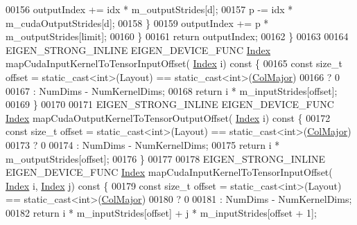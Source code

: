 \begin{DoxyCode}
00156         outputIndex += idx * m\_outputStrides[d];
00157         p -= idx * m\_cudaOutputStrides[d];
00158       \}
00159       outputIndex += p * m\_outputStrides[limit];
00160     \}
00161     \textcolor{keywordflow}{return} outputIndex;
00162   \}
00163 
00164   EIGEN\_STRONG\_INLINE EIGEN\_DEVICE\_FUNC \hyperlink{namespace_eigen_a62e77e0933482dafde8fe197d9a2cfde}{Index} mapCudaInputKernelToTensorInputOffset(
      \hyperlink{namespace_eigen_a62e77e0933482dafde8fe197d9a2cfde}{Index} i)\textcolor{keyword}{ const }\{
00165     \textcolor{keyword}{const} \textcolor{keywordtype}{size\_t} offset = \textcolor{keyword}{static\_cast<}\textcolor{keywordtype}{int}\textcolor{keyword}{>}(Layout) == static\_cast<int>(\hyperlink{group__enums_ggaacded1a18ae58b0f554751f6cdf9eb13a0cbd4bdd0abcfc0224c5fcb5e4f6669a}{ColMajor})
00166                               ? 0
00167                               : NumDims - NumKernelDims;
00168     \textcolor{keywordflow}{return} i * m\_inputStrides[offset];
00169   \}
00170 
00171   EIGEN\_STRONG\_INLINE EIGEN\_DEVICE\_FUNC \hyperlink{namespace_eigen_a62e77e0933482dafde8fe197d9a2cfde}{Index} mapCudaOutputKernelToTensorOutputOffset(
      \hyperlink{namespace_eigen_a62e77e0933482dafde8fe197d9a2cfde}{Index} i)\textcolor{keyword}{ const }\{
00172     \textcolor{keyword}{const} \textcolor{keywordtype}{size\_t} offset = \textcolor{keyword}{static\_cast<}\textcolor{keywordtype}{int}\textcolor{keyword}{>}(Layout) == static\_cast<int>(\hyperlink{group__enums_ggaacded1a18ae58b0f554751f6cdf9eb13a0cbd4bdd0abcfc0224c5fcb5e4f6669a}{ColMajor})
00173                               ? 0
00174                               : NumDims - NumKernelDims;
00175     \textcolor{keywordflow}{return} i * m\_outputStrides[offset];
00176   \}
00177 
00178   EIGEN\_STRONG\_INLINE EIGEN\_DEVICE\_FUNC \hyperlink{namespace_eigen_a62e77e0933482dafde8fe197d9a2cfde}{Index} mapCudaInputKernelToTensorInputOffset(
      \hyperlink{namespace_eigen_a62e77e0933482dafde8fe197d9a2cfde}{Index} i, \hyperlink{namespace_eigen_a62e77e0933482dafde8fe197d9a2cfde}{Index} j)\textcolor{keyword}{ const }\{
00179     \textcolor{keyword}{const} \textcolor{keywordtype}{size\_t} offset = \textcolor{keyword}{static\_cast<}\textcolor{keywordtype}{int}\textcolor{keyword}{>}(Layout) == static\_cast<int>(\hyperlink{group__enums_ggaacded1a18ae58b0f554751f6cdf9eb13a0cbd4bdd0abcfc0224c5fcb5e4f6669a}{ColMajor})
00180                               ? 0
00181                               : NumDims - NumKernelDims;
00182     \textcolor{keywordflow}{return} i * m\_inputStrides[offset] + j * m\_inputStrides[offset + 1];

\end{DoxyCode}
